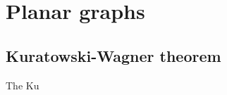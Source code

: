 \documentclass{article}
\author{Eric Luu}
\begin{document}
\section{Planar graphs}

\subsection{Kuratowski-Wagner theorem}
The Ku
\end{document}
